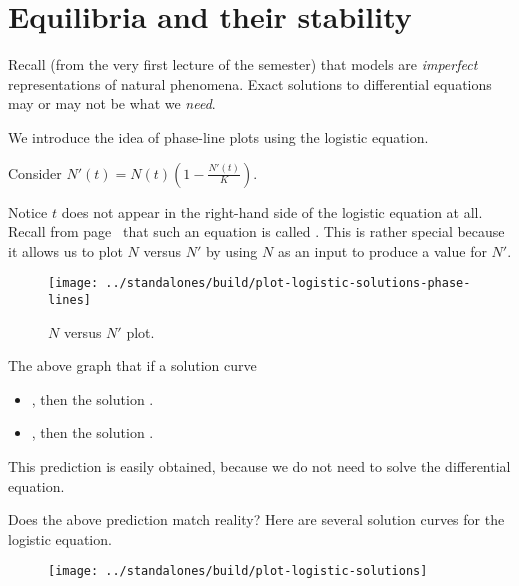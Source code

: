 \documentclass[../main.tex]{subfiles}
\begin{document}
 \section{Equilibria and their stability}

Recall (from the very first lecture of the semester) that models are \emph{imperfect} representations of natural phenomena. Exact solutions to differential equations may or may not be what we \emph{need}.  

We introduce the idea of phase-line plots using the logistic equation. 

\begin{example} \label{eq:diff-eq-logistic-equation-equilibria}
  Consider \(N'(t) = N(t) \left( 1 - \frac{N'(t)}{K} \right)\).

  Notice \(t\) does not appear in the right-hand side of the logistic equation at all. Recall from page~\pageref{def:autonomous} that such an equation is called . This is rather special because it allows us to plot \(N\) versus \(N'\) by using \(N\) as an input to produce a value for \(N'\).

  \begin{figure}[H] %
    \centering
    \texttt{[image: ../standalones/build/plot-logistic-solutions-phase-lines]}
    \caption{\(N\) versus \(N'\) plot.}
    \label{fig:logistic-solutions-phase-lines}
  \end{figure}

  \faStar{} The above graph  that if a solution curve 
  \begin{itemize}
    \item \underline{\hspace{2in}}, then the solution \underline{\hspace{3in}}.
    \item \underline{\hspace{2in}}, then the solution \underline{\hspace{3in}}.
  \end{itemize}

  This prediction is easily obtained, because we do not need to solve the differential equation.

  Does the above prediction match reality? Here are several solution curves for the logistic equation.
  \begin{figure}[H] %
    \centering
    \texttt{[image: ../standalones/build/plot-logistic-solutions]}
    \label{fig:logistic-solutions}
  \end{figure}

\end{example}
\end{document}
